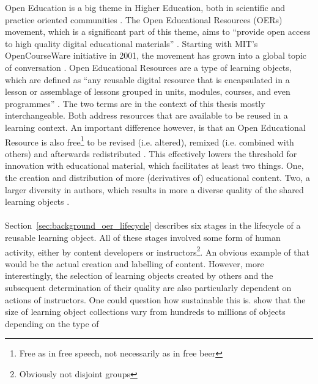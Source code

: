 Open Education is a big theme in Higher Education, both in scientific
\citep{Wiley2014, Duval2010} and practice oriented communities
\citep{Bussemaker2014, Trendsurfoe2014, Yuan2013, Johnson2013, OECD2007}.
The Open Educational Resources (OERs) movement, which is a significant
part of this theme, aims to ``provide open access to high quality digital
educational materials'' \citep{Caswell2008}. Starting with MIT's
OpenCourseWare initiative \citep{Abelson2008} in 2001, the movement has grown
into a global topic of conversation \citep{Hylen2012}.
Open Educational Resources are a type of learning objects, which are defined as
``any reusable digital resource that is encapsulated in a lesson or assemblage
of lessons grouped in units, modules, courses, and even programmes''
\citep{McGreal2004}. The two terms are in the context of this thesis mostly
interchangeable. Both address resources that are available to be reused in a
learning context. An important difference however, is that an Open Educational
Resource is also free\footnote{Free as in free speech, not necessarily as in
free beer} to be revised (i.e. altered), remixed (i.e. combined with others)
and afterwards redistributed \citep{Hilton2010}. This effectively lowers the
threshold for innovation with educational material, which facilitates at least two
things. One, the creation and distribution of more
(derivatives of) educational content. Two, a larger diversity in authors, which
results in more a diverse quality of the shared learning objects
\citep{Weller2010}.\\\\
\noindent
Section~\ref{sec:background_oer_lifecycle} describes six stages in the
lifecycle of a reusable learning object. All of these stages involved some form
of human activity, either by content developers or instructors\footnote{Obviously not
disjoint groups}. An obvious example of that would be the actual creation and
labelling of content. However, more interestingly, the selection of learning
objects created by others and the subsequent determination of their quality are
also particularly dependent on actions of instructors.
\noindent
One could question how sustainable this is.
\citet{Ochoa2009} show that the size of learning object collections
vary from hundreds to millions of objects depending on the type of
